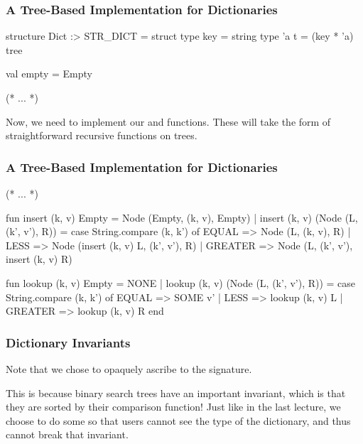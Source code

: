 \documentclass[aspectratio=169]{beamer}
\begin{document}
\begin{frame}[fragile]
  \frametitle{A Tree-Based Implementation for Dictionaries}

  \begin{codeblock}
    structure Dict :> STR_DICT =
      struct
        type key = string
        type 'a t = (key * 'a) tree

        val empty = Empty

        (* ... *)
  \end{codeblock}

  \pause
  \vspace{\fill}

  Now, we need to implement our  and  functions.
  These will take the form of straightforward recursive functions on trees.

  \pause
  \vspace{\fill}

\end{frame}

\begin{frame}[fragile]
  \frametitle{A Tree-Based Implementation for Dictionaries}
  \small
  \begin{codeblock}
    (* ... *)

      fun insert (k, v) Empty = Node (Empty, (k, v), Empty)
        | insert (k, v) (Node (L, (k', v'), R)) =
            case String.compare (k, k') of
              EQUAL   => Node (L, (k, v), R)
            | LESS    => Node (insert (k, v) L, (k', v'), R)
            | GREATER => Node (L, (k', v'), insert (k, v) R)

      fun lookup (k, v) Empty = NONE
        | lookup (k, v) (Node (L, (k', v'), R)) =
            case String.compare (k, k') of
              EQUAL   => SOME v'
            | LESS    => lookup (k, v) L
            | GREATER => lookup (k, v) R
    end
\end{codeblock}
\end{frame}

\begin{frame}[fragile]
  \frametitle{Dictionary Invariants}

  Note that we chose to opaquely ascribe to the  signature.

  \pause
  \vspace{\fill}

  This is because binary search trees have an important invariant, which
  is that they are sorted by their comparison function! Just like in the
  last lecture, we choose to do some  so that
  users cannot see the type of the dictionary, and thus cannot break that
  invariant.
\end{frame}
\end{document}
